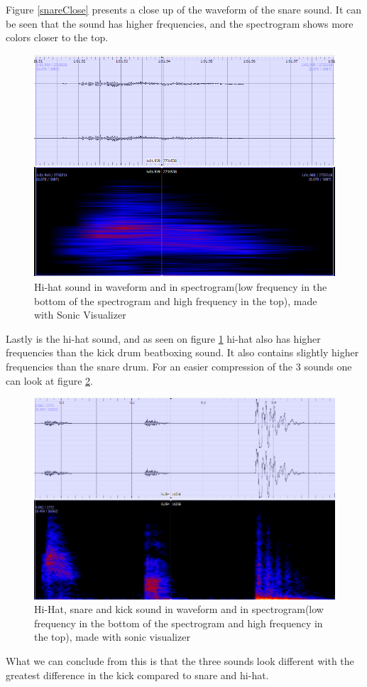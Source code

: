 \begin{flushleft}
Figure \ref{snareClose} presents a close up of the waveform of the snare sound. It can be seen that the sound has higher frequencies, and the spectrogram shows more colors closer to the top. 
\end{flushleft}
\begin{figure}[H]
	\begin{center}
		\includegraphics[scale =  0.5]{fig/HH-close-up-with-spectrogram.png}
		\caption{Hi-hat sound in waveform and in spectrogram(low frequency in the bottom of the spectrogram and high frequency in the top), made with Sonic Visualizer}
		\label{HHClose}
	\end{center}
\end{figure}
Lastly is the hi-hat sound, and as seen on figure \ref{HHClose} hi-hat also has higher frequencies than the kick drum beatboxing sound. It also contains slightly higher frequencies than the snare drum. For an easier compression of the 3 sounds one can look at figure \ref{HH-Snare-Kick}.
\begin{figure}[H]
	\begin{center}
		\includegraphics[scale =  0.5]{fig/hh-snare-kick-with-spectogram.png}
		\caption{Hi-Hat, snare and kick sound in waveform and in spectrogram(low frequency in the bottom of the spectrogram and high frequency in the top), made with sonic visualizer}
		\label{HH-Snare-Kick}
	\end{center}
\end{figure}
What we can conclude from this is that the three sounds look different with the greatest difference in the kick compared to snare and hi-hat.